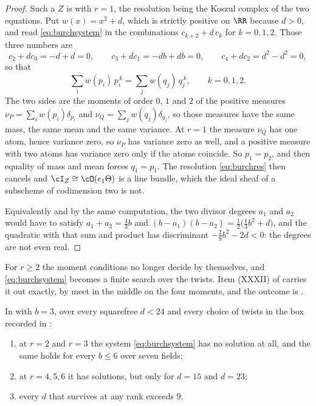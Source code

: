 \begin{proof}
Such a $Z$ is  with $r=1$, the resolution being the Koszul
complex of the two equations. Put $w(x)=x^{2}+d$, which is strictly positive
on $\RR$ because $d>0$, and read \eqref{eq:burchsystem} in the combinations
$c_{k+2}+d\,c_{k}$ for $k=0,1,2$. Those three numbers are
\[
  c_{2}+dc_{0}=-d+d=0,\qquad
  c_{3}+dc_{1}=-db+db=0,\qquad
  c_{4}+dc_{2}=d^{2}-d^{2}=0,
\]
so that
\[
  \sum_{i}w(p_{i})\,p_{i}^{\,k}=\sum_{j}w(q_{j})\,q_{j}^{\,k},
  \qquad k=0,1,2 .
\]
The two sides are the moments of order $0$, $1$ and $2$ of the positive
measures $\nu_{P}=\sum_{i}w(p_{i})\delta_{p_{i}}$ and
$\nu_{Q}=\sum_{j}w(q_{j})\delta_{q_{j}}$, so those measures have the same
mass, the same mean and the same variance. At $r=1$ the measure $\nu_{Q}$ has
one atom, hence variance zero, so $\nu_{P}$ has variance zero as well, and a
positive measure with two atoms has variance zero only if the atoms coincide.
So $p_{1}=p_{2}$, and then equality of mass and mean forces $q_{1}=p_{1}$. The
resolution \eqref{eq:burchres} then cancels and $\cI_{Z}\cong\cO(e_{1}\Theta)$
is a line bundle, which the ideal sheaf of a subscheme of codimension two is
not.

Equivalently and by the same computation, the two divisor degrees $a_{1}$ and
$a_{2}$ would have to satisfy $a_{1}+a_{2}=\tfrac43b$ and
$(b-a_{1})(b-a_{2})=\tfrac12\bigl(\tfrac13b^{2}+d\bigr)$, and the quadratic
with that sum and product has discriminant $-\tfrac29b^{2}-2d<0$: the degrees
are not even real.
\end{proof}

For $r\ge2$ the moment conditions no longer decide by themselves, and
\eqref{eq:burchsystem} becomes a finite search over the twists. Item (XXXII)
of  carries it out exactly, by meet in the middle on
the four moments, and the outcome is .

\begin{theorem}%
\label{thm:burchsearch}
In  with $b=3$, over every squarefree $d<24$ and every
choice of twists in the box recorded in :
\begin{enumerate}[label=\textup{(\roman*)},leftmargin=2.6em]
\item at $r=2$ and $r=3$ the system \eqref{eq:burchsystem} has no solution at
  all, and the same holds for every $b\le6$ over seven fields;
\item at $r=4,5,6$ it has solutions, but only for $d=15$ and $d=23$;
\item every $d$ that survives at any rank exceeds $9$.
\end{enumerate}
\end{theorem}

